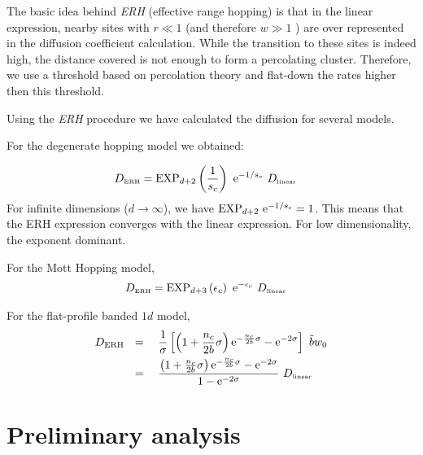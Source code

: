 The basic idea behind \emph{ERH} (effective range hopping) is that in the linear
expression, nearby sites 
with $r\ll 1$ (and therefore $w \gg 1$ ) are over represented in
the diffusion coefficient calculation. While the transition to
these sites is indeed high, the distance covered is not enough
to form a percolating cluster. Therefore, we use a threshold based
on percolation theory and flat-down the rates higher then this threshold.


Using the \emph{ERH} procedure we have calculated the diffusion for several models.


For the degenerate hopping model we obtained:

\begin{align}
D_{\tbox{ERH}} &=  \mathrm{EXP}_{d{+}2}\left(\frac{1}{s_c}\right)  \  \eexp{-1/s_c}  \ D_{\tbox{linear}}
\end{align}
%
For infinite dimensions ($d\rightarrow\infty$),  we have $\mathrm{EXP}_{d{+}2}\  \mbox{e}^{-1/s_c} = 1$. 
This means that the ERH expression converges with the linear expression.
For low dimensionality, the exponent dominant.


For the Mott Hopping model,
%
\begin{align}
D_{\tbox{ERH}} &=\mathrm{EXP}_{d{+}3}\left(\epsilon_c\right)  \  \eexp{-\epsilon_c}  \ D_{\tbox{linear}}
\end{align}
%


For the flat-profile banded $1d$ model,
\begin{align}
D_{\text{ERH}} \ \ &= \ \ 
\ \frac{1}{\sigma}\left[ 
\left(1+\frac{n_c}{2b}\sigma\right)\eexp{-\frac{n_c}{2b}\sigma} - \eexp{-2\sigma}
\right] \ \tilde{b} w_0 \\ &=\ \ 
\ \frac{\left(1+\frac{n_c}{2b}\sigma\right)\eexp{-\frac{n_c}{2b}\sigma} - \eexp{-2\sigma}}
       {1 - \eexp{-2\sigma}}
   \ D_{\tbox{linear}}
\end{align}



\chapter{Preliminary analysis}





